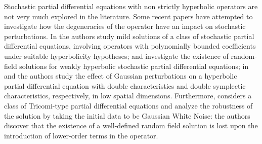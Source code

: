 \documentclass{article}
\begin{document}
Stochastic partial differential equations with non strictly hyperbolic operators are not very much explored in the literature.  Some recent papers have attempted to investigate how the degeneracies of the operator have an impact on stochastic perturbations. In \cite{Ascanelli2} the authors study mild solutions of a class of stochastic partial differential equations, involving operators with polynomially bounded coefficients under suitable hyperbolicity hypotheses; \cite{Ascanelli3} and \cite{Ascanelli1} investigate the existence of random-field solutions for weakly hyperbolic stochastic partial differential equations; in \cite{EnricoAlberto} and \cite{EnricoLeonardo} the authors study the effect of Gaussian perturbations on a hyperbolic partial differential equation with double characteristics and double symplectic characteristics, respectively, in
low spatial dimensions. Furthermore, \cite{EnricoAlberto2} considers a class of Tricomi-type partial differential equations and analyze the robustness of the solution by taking the initial data to be Gaussian White Noise: the authors  discover that the existence of a well-defined random field solution is lost upon the introduction of lower-order terms in the operator.
\end{document}
